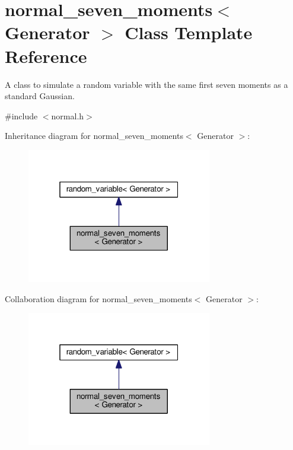 \hypertarget{classnormal__seven__moments}{}\section{normal\+\_\+seven\+\_\+moments$<$ Generator $>$ Class Template Reference}
\label{classnormal__seven__moments}


A class to simulate a random variable with the same first seven moments as a standard Gaussian.  




{\ttfamily \#include $<$normal.\+h$>$}



Inheritance diagram for normal\+\_\+seven\+\_\+moments$<$ Generator $>$\+:\nopagebreak
\begin{figure}[H]
\begin{center}
\leavevmode
\includegraphics[width=229pt]{classnormal__seven__moments__inherit__graph}
\end{center}
\end{figure}


Collaboration diagram for normal\+\_\+seven\+\_\+moments$<$ Generator $>$\+:\nopagebreak
\begin{figure}[H]
\begin{center}
\leavevmode
\includegraphics[width=229pt]{classnormal__seven__moments__coll__graph}
\end{center}
\end{figure}
